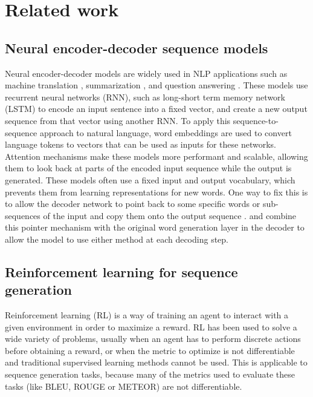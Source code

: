 \documentclass{article} \usepackage{iclr2018_arxiv,times}
\begin{document}
\section{Related work}
\label{sec:related-work}

\subsection{Neural encoder-decoder sequence models}
\label{ssec:neural-sequence-models}


Neural encoder-decoder models are widely used in NLP applications such as machine translation \citep{sutskever2014}, summarization \citep{chopra2016,nallapati2016}, and question answering \citep{hermann2015}. These models use recurrent neural networks (RNN), such as long-short term memory network (LSTM) \citep{hochreiter1997} to encode an input sentence into a fixed vector, and create a new output sequence from that vector using another RNN. To apply this sequence-to-sequence approach to natural language, word embeddings \citep{mikolov2013,pennington2014} are used to convert language tokens to vectors that can be used as inputs for these networks.
Attention mechanisms \citep{bahdanau2014} make these models more performant and scalable, allowing them to look back at parts of the encoded input sequence while the output is generated.
These models often use a fixed input and output vocabulary, which prevents them from learning representations for new words. One way to fix this is to allow the decoder network to point back to some specific words or sub-sequences of the input and copy them onto the output sequence \citep{vinyals2015}. \citet{gulcehre2016} and \citet{merity2016} combine this pointer mechanism with the original word generation layer in the decoder to allow the model to use either method at each decoding step.

\subsection{Reinforcement learning for sequence generation}


Reinforcement learning (RL) is a way of training an agent to interact with a given environment in order to maximize a reward. RL has been used to solve a wide variety of problems, usually when an agent has to perform discrete actions before obtaining a reward, or when the metric to optimize is not differentiable and traditional supervised learning methods cannot be used. This is applicable to sequence generation tasks, because many of the metrics used to evaluate these tasks (like BLEU, ROUGE or METEOR) are not differentiable.
\end{document}
